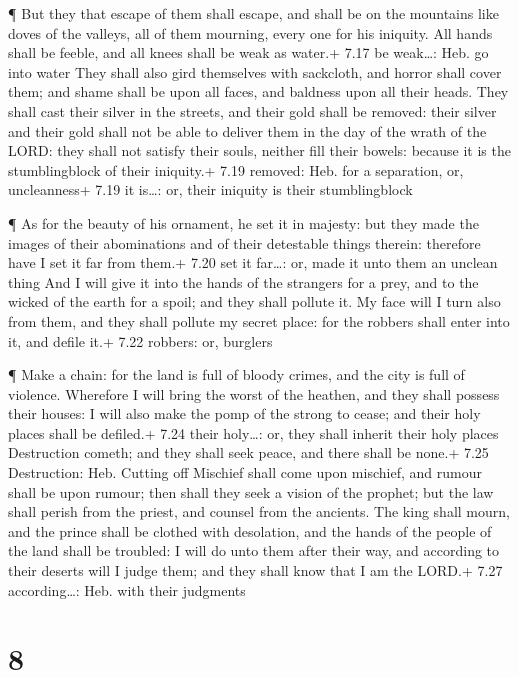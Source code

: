  ¶ But they that escape of them shall escape, and shall be
on the mountains like doves of the valleys, all of them mourning, every
one for his iniquity.  All hands shall be feeble, and all
knees shall be weak as water.+ 7.17 be weak\ldots: Heb. go into water
 They shall also gird themselves with sackcloth, and horror
shall cover them; and shame shall be upon all faces, and baldness upon
all their heads.  They shall cast their silver in the
streets, and their gold shall be removed: their silver and their gold
shall not be able to deliver them in the day of the wrath of the LORD:
they shall not satisfy their souls, neither fill their bowels: because
it is the stumblingblock of their iniquity.+ 7.19 removed: Heb. for a
separation, or, uncleanness+ 7.19 it is\ldots: or, their iniquity is
their stumblingblock

 ¶ As for the beauty of his ornament, he set it in majesty:
but they made the images of their abominations and of their detestable
things therein: therefore have I set it far from them.+ 7.20 set it
far\ldots: or, made it unto them an unclean thing  And I
will give it into the hands of the strangers for a prey, and to the
wicked of the earth for a spoil; and they shall pollute it.
 My face will I turn also from them, and they shall pollute
my secret place: for the robbers shall enter into it, and defile it.+
7.22 robbers: or, burglers

 ¶ Make a chain: for the land is full of bloody crimes, and
the city is full of violence.  Wherefore I will bring the
worst of the heathen, and they shall possess their houses: I will also
make the pomp of the strong to cease; and their holy places shall be
defiled.+ 7.24 their holy\ldots: or, they shall inherit their holy
places  Destruction cometh; and they shall seek peace, and
there shall be none.+ 7.25 Destruction: Heb. Cutting off 
Mischief shall come upon mischief, and rumour shall be upon rumour; then
shall they seek a vision of the prophet; but the law shall perish from
the priest, and counsel from the ancients.  The king shall
mourn, and the prince shall be clothed with desolation, and the hands of
the people of the land shall be troubled: I will do unto them after
their way, and according to their deserts will I judge them; and they
shall know that I am the LORD.+ 7.27 according\ldots: Heb. with their
judgments

\hypertarget{section-7}{%
\section{8}\label{section-7}}

